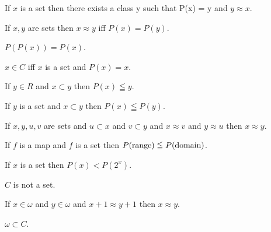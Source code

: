 \documentclass[a4paper,draft]{amsproc}
\begin{document}
\begin{forthel}
\begin{theorem}[153]
If $x$ is a set then there exists a class y such that P(x) = y and $y \approx x$.
\end{theorem}

\begin{theorem}[154]
If $x, y$ are sets then $x \approx y$ iff $P(x) = P(y)$.
\end{theorem}

\begin{theorem}[155]
$P(P(x)) = P(x)$.
\end{theorem}

\begin{theorem}[156]
$x \in C$ iff $x$ is a set and $P(x) = x$.
\end{theorem}

\begin{theorem}[157]
If $y \in R$ and $x \subset y$ then $P(x) \leqq y$.
\end{theorem}

\begin{theorem}[158]
If $y$ is a set and $x \subset y$ then $P(x) \leqq P(y)$.
\end{theorem}

\begin{theorem}[159]
If $x, y, u, v$ are sets and $u \subset x$ and $v \subset y$ and $x \approx v$ and $y \approx u$ then $x \approx y$.
\end{theorem}

\begin{theorem}[160]
If $f$ is a map and $f$ is a set then $P(\range f) \leqq P(\domain f)$.
\end{theorem}

\begin{theorem}[161]
If $x$ is a set then $P(x) < P(2^{x})$.
\end{theorem}

\begin{theorem}[162]
$C$ is not a set.
\end{theorem}

\begin{theorem}[163]
If $x \in \omega$ and $y \in \omega$ and $x + 1 \approx y + 1$ then $x \approx y$.
\end{theorem}

\begin{theorem}
$\omega \subset C$.
\end{theorem}


\end{forthel}
\end{document}
